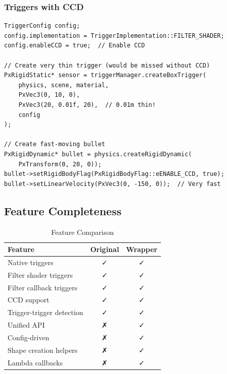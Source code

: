\subsubsection{Triggers with CCD}

\begin{lstlisting}[caption={CCD trigger for fast objects}]
TriggerConfig config;
config.implementation = TriggerImplementation::FILTER_SHADER;
config.enableCCD = true;  // Enable CCD

// Create very thin trigger (would be missed without CCD)
PxRigidStatic* sensor = triggerManager.createBoxTrigger(
    physics, scene, material,
    PxVec3(0, 10, 0),
    PxVec3(20, 0.01f, 20),  // 0.01m thin!
    config
);

// Create fast-moving bullet
PxRigidDynamic* bullet = physics.createRigidDynamic(
    PxTransform(0, 20, 0));
bullet->setRigidBodyFlag(PxRigidBodyFlag::eENABLE_CCD, true);
bullet->setLinearVelocity(PxVec3(0, -150, 0));  // Very fast
\end{lstlisting}


\subsection{Feature Completeness}

\begin{table}[h]
\centering
\begin{tabular}{|l|c|c|}
\hline
\textbf{Feature} & \textbf{Original} & \textbf{Wrapper} \\
\hline
Native triggers & ✓ & ✓ \\
Filter shader triggers & ✓ & ✓ \\
Filter callback triggers & ✓ & ✓ \\
CCD support & ✓ & ✓ \\
Trigger-trigger detection & ✓ & ✓ \\
Unified API & ✗ & ✓ \\
Config-driven & ✗ & ✓ \\
Shape creation helpers & ✗ & ✓ \\
Lambda callbacks & ✗ & ✓ \\
\hline
\end{tabular}
\caption{Feature Comparison}
\end{table}



